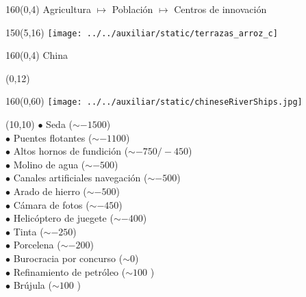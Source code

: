 \documentclass[shownotes,aspectratio=169]{beamer}
\begin{document}
\begin{frame}[plain]
 \begin{textblock}{160}(0,4)
  \LARGE \centering \textcolor{black!85}{Agricultura $\mapsto$ Población $\mapsto$ Centros de innovación }
 \end{textblock} 

\vspace{1cm}
\begin{textblock}{150}(5,16)
 \centering
 \texttt{[image: ../../auxiliar/static/terrazas\_arroz\_c]}
\end{textblock}

\end{frame}

\begin{frame}[plain]
 \begin{textblock}{160}(0,4)
  \LARGE \centering \textcolor{black!85}{China}
 \end{textblock} 



\begin{textblock}{80}(0,12)
  \Large \centering \textcolor{black!85}{}
\end{textblock} 
\begin{textblock}{160}(0,60)
  \centering
\texttt{[image: ../../auxiliar/static/chineseRiverShips.jpg]}  
  \end{textblock} 

\begin{textblock}{70}(10,10) \footnotesize
 $\bullet$ Seda ($\sim -1500$) \\
 $\bullet$ Puentes flotantes ($\sim -1100$) \\
 $\bullet$ Altos hornos de fundición ($\sim -750/-450$) \\
 $\bullet$ Molino de agua ($\sim -500$) \\
 $\bullet$ Canales artificiales navegación ($\sim -500$) \\
 $\bullet$ Arado de hierro ($\sim -500$) \\
 $\bullet$ Cámara de fotos ($\sim -450$) \\
 $\bullet$ Helicóptero de juegete ($\sim -400$) \\
 $\bullet$ Tinta ($\sim -250$) \\
 $\bullet$ Porcelena ($\sim -200$) \\
 $\bullet$ Burocracia por concurso ($\sim 0$) \\
 $\bullet$ Refinamiento de petróleo ($\sim 100$ ) \\
 $\bullet$ Brújula ($\sim 100$ ) 
 \end{textblock} 



\end{frame}
\end{document}
